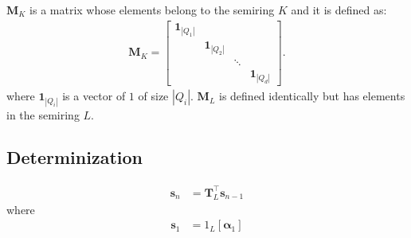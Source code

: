 $\mathbf{M}_K$ is a matrix whose elements belong to the semiring $K$
and it is defined as:
\begin{align}
    \mathbf{M}_K = \begin{bmatrix}
        \mathbf{1}_{|Q_1|} & & & \\
        & \mathbf{1}_{|Q_2|} & & \\
        & & \ddots & \\
        & & & \mathbf{1}_{|Q_d|}
    \end{bmatrix}.
\end{align}
where $\mathbf{1}_{|Q_i|}$ is a vector of $1$ of size $|Q_i|$. $\mathbf{M}_L$
is defined identically but has elements in the semiring $L$.

\subsection{Determinization}

\begin{align}
    \mathbf{s}_n &= \mathbf{T}_L^\top \mathbf{s}_{n-1}
\end{align}
where
\begin{align}
    \mathbf{s}_1 &= 1_L[\boldsymbol{\alpha}_1]
\end{align}

